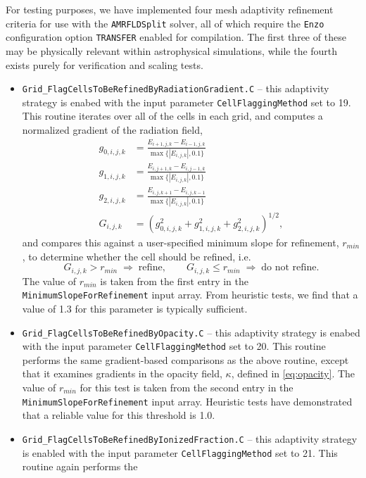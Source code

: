 \documentclass[letterpaper,10pt]{article}
\renewcommand{\(}{\left(}
\renewcommand{\)}{\right)}
\newcommand{\enzo}{{\tt Enzo} }
\begin{document}
For testing purposes, we have implemented four mesh adaptivity
refinement criteria for use with the {\tt AMRFLDSplit} solver, all of
which require the \enzo configuration option {\tt TRANSFER} enabled
for compilation.  The first three of these may be physically relevant
within astrophysical simulations, while the fourth exists purely for
verification and scaling tests.  
\begin{itemize}
\item {\tt Grid\_FlagCellsToBeRefinedByRadiationGradient.C} -- this
  adaptivity strategy is enabed with the input parameter 
  {\tt CellFlaggingMethod} set to 19.  This routine iterates over all
  of the cells in each grid, and computes a normalized gradient of the
  radiation field,
  \begin{align*}
     g_{0,i,j,k} &= \frac{E_{i+1,j,k}-E_{i-1,j,k}}{\max\{|E_{i,j,k}|, 0.1\}}\\
     g_{1,i,j,k} &= \frac{E_{i,j+1,k}-E_{i,j-1,k}}{\max\{|E_{i,j,k}|, 0.1\}}\\
     g_{2,i,j,k} &= \frac{E_{i,j,k+1}-E_{i,j,k-1}}{\max\{|E_{i,j,k}|, 0.1\}}\\
     G_{i,j,k} &= \( g_{0,i,j,k}^2 + g_{1,i,j,k}^2 + g_{2,i,j,k}^2 \)^{1/2},
  \end{align*}
  and compares this against a user-specified minimum slope for
  refinement, $r_{min}$, to determine whether the cell should be
  refined, i.e.
  \[
     G_{i,j,k} > r_{min} \;\Rightarrow\;\text{refine}, \qquad
     G_{i,j,k} \le r_{min} \;\Rightarrow\;\text{do not refine}.
  \]
  The value of $r_{min}$ is taken from the first entry in the 
  {\tt MinimumSlopeForRefinement} input array.  From heuristic tests,
  we find that a value of 1.3 for this parameter is typically
  sufficient.
\item {\tt Grid\_FlagCellsToBeRefinedByOpacity.C} -- this adaptivity
  strategy is enabed with the input parameter {\tt CellFlaggingMethod}
  set to 20.  This routine performs the same gradient-based comparisons as 
  the above routine, except that it examines gradients in the opacity
  field, $\kappa$, defined in \eqref{eq:opacity}.  The value of
  $r_{min}$ for this test is taken from the second entry in the 
  {\tt MinimumSlopeForRefinement} input array.  Heuristic tests have
  demonstrated that a reliable value for this threshold is 1.0.
\item {\tt Grid\_FlagCellsToBeRefinedByIonizedFraction.C} -- this
  adaptivity strategy is enabled with the input parameter 
  {\tt CellFlaggingMethod} set to 21.  This routine again performs the

\end{itemize}
\end{document}
